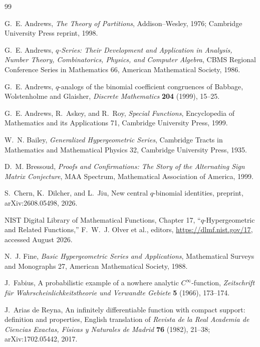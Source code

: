 \documentclass[11pt,oneside,openany]{book}
\theoremstyle{definition}
\theoremstyle{remark}
\begin{document}
\begin{thebibliography}{99}

G.~E. Andrews,
\emph{The Theory of Partitions},
Addison--Wesley, 1976; Cambridge University Press reprint, 1998.

G.~E. Andrews,
\emph{$q$-Series: Their Development and Application in Analysis, Number Theory, Combinatorics, Physics, and Computer Algebra},
CBMS Regional Conference Series in Mathematics 66, American Mathematical Society, 1986.

G.~E. Andrews,
$q$-analogs of the binomial coefficient congruences of Babbage, Wolstenholme and Glaisher,
\emph{Discrete Mathematics} \textbf{204} (1999), 15--25.

G.~E. Andrews, R.~Askey, and R.~Roy,
\emph{Special Functions},
Encyclopedia of Mathematics and its Applications 71, Cambridge University Press, 1999.

W.~N. Bailey,
\emph{Generalized Hypergeometric Series},
Cambridge Tracts in Mathematics and Mathematical Physics 32, Cambridge University Press, 1935.

D.~M. Bressoud,
\emph{Proofs and Confirmations: The Story of the Alternating Sign Matrix Conjecture},
MAA Spectrum, Mathematical Association of America, 1999.

S.~Chern, K.~Dilcher, and L.~Jiu,
New central $q$-binomial identities,
preprint, arXiv:2608.05498, 2026.

NIST Digital Library of Mathematical Functions,
Chapter 17, ``$q$-Hypergeometric and Related Functions,''
F.~W.~J. Olver et al., editors, \url{https://dlmf.nist.gov/17}, accessed August 2026.

N.~J. Fine,
\emph{Basic Hypergeometric Series and Applications},
Mathematical Surveys and Monographs 27, American Mathematical Society, 1988.

J.~Fabius,
A probabilistic example of a nowhere analytic $C^\infty$-function,
\emph{Zeitschrift f\"ur Wahrscheinlichkeitstheorie und Verwandte Gebiete}
\textbf{5} (1966), 173--174.

J.~Arias de Reyna,
An infinitely differentiable function with compact support: definition and properties,
English translation of \emph{Revista de la Real Academia de Ciencias Exactas,
F\'isicas y Naturales de Madrid} \textbf{76} (1982), 21--38;
arXiv:1702.05442, 2017.


\end{thebibliography}
\end{document}
